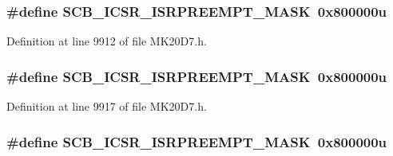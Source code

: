 \subsubsection[{\texorpdfstring{S\+C\+B\+\_\+\+I\+C\+S\+R\+\_\+\+I\+S\+R\+P\+R\+E\+E\+M\+P\+T\+\_\+\+M\+A\+SK}{SCB_ICSR_ISRPREEMPT_MASK}}]{\setlength{\rightskip}{0pt plus 5cm}\#define S\+C\+B\+\_\+\+I\+C\+S\+R\+\_\+\+I\+S\+R\+P\+R\+E\+E\+M\+P\+T\+\_\+\+M\+A\+SK~0x800000u}\hypertarget{group___s_c_b___register___masks_ga5ecbf8248ffbd07923fc188497a5a931}{}\label{group___s_c_b___register___masks_ga5ecbf8248ffbd07923fc188497a5a931}


Definition at line 9912 of file M\+K20\+D7.\+h.

\subsubsection[{\texorpdfstring{S\+C\+B\+\_\+\+I\+C\+S\+R\+\_\+\+I\+S\+R\+P\+R\+E\+E\+M\+P\+T\+\_\+\+M\+A\+SK}{SCB_ICSR_ISRPREEMPT_MASK}}]{\setlength{\rightskip}{0pt plus 5cm}\#define S\+C\+B\+\_\+\+I\+C\+S\+R\+\_\+\+I\+S\+R\+P\+R\+E\+E\+M\+P\+T\+\_\+\+M\+A\+SK~0x800000u}\hypertarget{group___s_c_b___register___masks_ga5ecbf8248ffbd07923fc188497a5a931}{}\label{group___s_c_b___register___masks_ga5ecbf8248ffbd07923fc188497a5a931}


Definition at line 9917 of file M\+K20\+D7.\+h.

\subsubsection[{\texorpdfstring{S\+C\+B\+\_\+\+I\+C\+S\+R\+\_\+\+I\+S\+R\+P\+R\+E\+E\+M\+P\+T\+\_\+\+M\+A\+SK}{SCB_ICSR_ISRPREEMPT_MASK}}]{\setlength{\rightskip}{0pt plus 5cm}\#define S\+C\+B\+\_\+\+I\+C\+S\+R\+\_\+\+I\+S\+R\+P\+R\+E\+E\+M\+P\+T\+\_\+\+M\+A\+SK~0x800000u}\hypertarget{group___s_c_b___register___masks_ga5ecbf8248ffbd07923fc188497a5a931}{}\label{group___s_c_b___register___masks_ga5ecbf8248ffbd07923fc188497a5a931}


